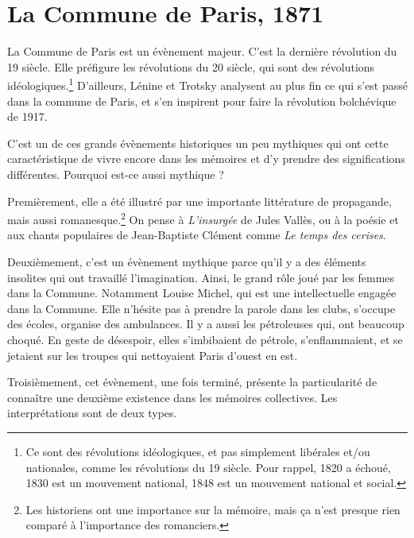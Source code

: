\documentclass[12pt]{report}
\begin{document}
\section{La Commune de Paris, 1871}




La Commune de Paris est un évènement majeur.
C'est la dernière révolution du 19 siècle.
Elle préfigure les révolutions du 20 siècle, qui sont des révolutions idéologiques.\footnote{Ce sont des révolutions idéologiques, et pas simplement libérales et/ou nationales, comme les révolutions du 19 siècle. Pour rappel, 1820 a échoué, 1830 est un mouvement national, 1848 est un mouvement national et social.}
D'ailleurs, Lénine et Trotsky analysent au plus fin ce qui s'est passé dans la commune de Paris, et s'en inspirent pour faire la révolution bolchévique de 1917.

C'est un de ces grands évènements historiques un peu mythiques qui ont cette caractéristique de vivre encore dans les mémoires et d'y prendre des significations différentes.
Pourquoi est-ce aussi mythique ?

Premièrement, elle a été illustré par une importante littérature de propagande, mais aussi romanesque.\footnote{Les historiens ont une importance sur la mémoire, mais ça n'est presque rien comparé à l'importance des romanciers.}
On pense à \emph{L'insurgée} de Jules Vallès, ou à la poésie et aux chants populaires de Jean-Baptiste Clément comme \emph{Le temps des cerises}.

Deuxièmement, c'est un évènement mythique parce qu'il y a des éléments insolites qui ont travaillé l'imagination.
Ainsi, le grand rôle joué par les femmes dans la Commune.
Notamment Louise Michel, qui est une intellectuelle engagée dans la Commune.
Elle n'hésite pas à prendre la parole dans les clubs, s'occupe des écoles, organise des ambulances.
Il y a aussi les pétroleuses qui, ont beaucoup choqué.
En geste de désespoir, elles s'imbibaient de pétrole, s'enflammaient, et se jetaient sur les troupes qui nettoyaient Paris d'ouest en est.

Troisièmement, cet évènement, une fois terminé, présente la particularité de connaître une deuxième existence dans les mémoires collectives.
Les interprétations sont de deux types.
\end{document}
